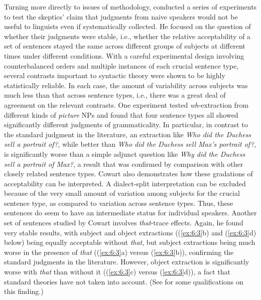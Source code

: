  Turning more directly to issues of methodology, \citep[12\textendash{}27]{Cowart1997} conducted a
 series of experiments to test the skeptics' claim that judgments from naive speakers would not be useful to linguists even if systematically collected. He focused on the question of whether their judgments were stable, i.e., whether the relative acceptability of a set of sentences stayed the same across different groups of subjects at different times under different conditions. With a careful experimental design involving counterbalanced orders and multiple instances of each crucial sentence type, several contrasts important to syntactic theory were shown to be highly statistically reliable. In each case, the amount of variability across subjects was much less than that across sentence types, i.e., there was a great deal of agreement on the relevant contrasts. One experiment tested \textit{wh}-extraction from different kinds of \textit{picture} NPs and found that  four sentence types all showed significantly different judgments of grammaticality. In particular,  in contrast to the standard judgment in the literature, an extraction like \textit{Who did the Duchess sell a portrait of?}, while better than \textit{Who did the Duchess sell Max's portrait of?}, is significantly  worse than a simple adjunct question like \textit{Why did the Duchess sell a portrait of Max?}, a result that was confirmed by comparison with other closely related  sentence types. Cowart also demonstrates how these  gradations of acceptability  can be interpreted. A dialect-split interpretation can be excluded
 because of the very small amount of variation among subjects for the crucial sentence type, as compared to variation across sentence types. Thus, these sentences do seem to have an intermediate status for individual speakers. Another set of sentences studied by Cowart involves \textit{that}-trace effects. Again, he found very stable results, with subject and object extractions ((\ref{ex:6:3}b) and (\ref{ex:6:3}d) below) being equally acceptable without \textit{that}, but subject extractions being much worse in the presence of \textit{that} ((\ref{ex:6:3}a) versus (\ref{ex:6:3}b)), confirming the standard judgments in the literature. However, object extraction is significantly worse with \textit{that} than without it ((\ref{ex:6:3}c) versus (\ref{ex:6:3}d)), a fact that standard theories have not taken into account. (See \citet[12\textendash{}27]{Cowart1997} for some qualifications on this finding.)


